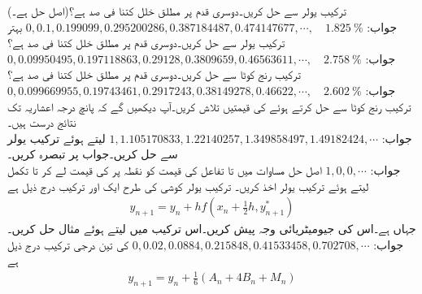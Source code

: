 \quad
ترکیب یولر سے  حل کریں۔دوسری قدم پر مطلق خلل کتنا فی صد ہے؟(اصل حل  ہے۔)\\
جواب:\quad
$0,0.1,0.199099,0.295200286,0.387184487,0.474147677,\cdots, \quad \SI{1.825}{\percent}$
\quad
بہتر ترکیب یولر سے  حل کریں۔دوسری قدم پر مطلق خلل کتنا فی صد ہے؟\\
جواب:\quad
$0,0.09950495,0.197118863,0.29128,0.3809659,0.46563611,\cdots,\quad \SI{2.758}{\percent}$
\quad
ترکیب رنج کوٹا  سے  حل کریں۔دوسری قدم پر مطلق خلل کتنا فی صد ہے؟\\
جواب:\quad
$0,0.099669955,0.19743461,0.2917243,0.38149278,0.46622,\cdots,\quad \SI{2.602}{\percent}$
\quad
ترکیب رنج کوٹا  سے  حل کرتے ہوئے  کی قیمتیں تلاش کریں۔آپ دیکھیں گے کہ پانچ درجہ اعشاریہ تک نتائج درست ہیں۔\\
جواب:\quad
$1,1.105170833,1.22140257,1.349858497,1.49182424,\cdots$
\quad
{} لیتے ہوئے ترکیب یولر سے  حل کریں۔جواب پر تبصرہ کریں۔\\
جواب:\quad
$1,0,0,\cdots$
اصل حل 
\quad
مساوات  میں  تا  تفاعل  کی قیمت کو نقطہ  پر  کی قیمت لے کر  تا  تکمل لیتے ہوئے ترکیب یولر اخذ کریں۔
\quad
ترکیب یولر کوشی کی طرح ایک اور ترکیب درج ذیل ہے
\begin{align*}
y_{n+1}=y_n+hf(x_n+\tfrac{1}{2}h,y^*_{n+1})
\end{align*}
جہاں  ہے۔اس کی جیومیٹریائی وجہ پیش کریں۔اس ترکیب میں  لیتے ہوئے مثال  حل کریں۔\\
جواب:\quad
$0,0.02,0.0884,0.215848,0.41533458,0.702708,\cdots$
\quad
{} کی تین درجی ترکیب درج ذیل ہے
\begin{align*}
y_{n+1}=y_n+\tfrac{1}{6}(A_n+4B_n+M_n)
\end{align*}
